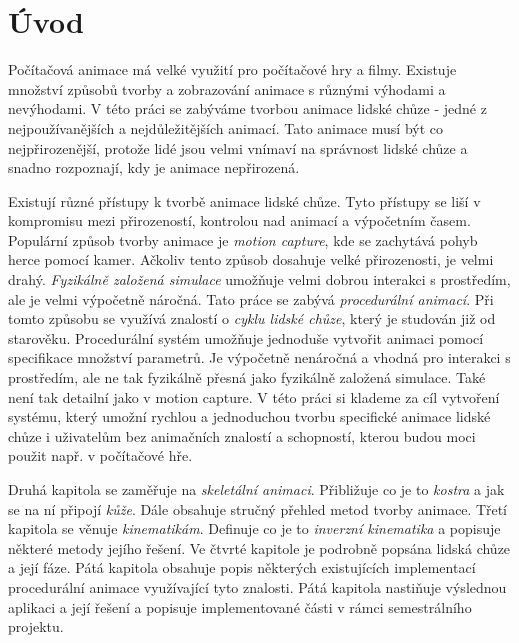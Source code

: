 
\chapter{Úvod}
Počítačová animace má velké využití pro počítačové hry a filmy. Existuje množství způsobů tvorby a zobrazování animace s různými výhodami a nevýhodami. V této práci se zabýváme tvorbou animace lidské chůze - jedné z nejpoužívanějších a nejdůležitějších animací. Tato animace musí být co nejpřirozenější, protože lidé jsou velmi vnímaví na správnost lidské chůze a snadno rozpoznají, kdy je animace nepřirozená.

Existují různé přístupy k tvorbě animace lidské chůze. Tyto přístupy se liší v kompromisu mezi přirozeností, kontrolou nad animací a výpočetním časem. Populární způsob tvorby animace je \textit{motion capture}, kde se zachytává pohyb herce pomocí kamer. Ačkoliv tento způsob dosahuje velké přirozenosti, je velmi drahý. \textit{Fyzikálně založená simulace} umožňuje velmi dobrou interakci s prostředím, ale je velmi výpočetně náročná. Tato práce se zabývá \textit{procedurální animací}. Při tomto způsobu se využívá znalostí o \textit{cyklu lidské chůze}, který je studován již od starověku. Procedurální systém umožňuje jednoduše vytvořit animaci pomocí specifikace množství parametrů. Je výpočetně nenáročná a vhodná pro interakci s prostředím, ale ne tak fyzikálně přesná jako fyzikálně založená simulace. Také není tak detailní jako v motion capture.  V této práci si klademe za cíl vytvoření systému, který umožní rychlou a jednoduchou tvorbu specifické animace lidské chůze i uživatelům bez animačních znalostí a schopností, kterou budou moci použit např. v počítačové hře.

Druhá kapitola se zaměřuje na \textit{skeletální animaci}. Přibližuje co je to \textit{kostra} a jak se na ní připojí \textit{kůže}. Dále obsahuje stručný přehled metod tvorby animace. Třetí kapitola se věnuje \textit{kinematikám}. Definuje co je to \textit{inverzní kinematika} a popisuje některé metody jejího řešení. Ve čtvrté kapitole je podrobně popsána lidská chůze a její fáze. Pátá kapitola obsahuje popis některých existujících implementací procedurální animace využívající tyto znalosti. Pátá kapitola nastiňuje výslednou aplikaci a její řešení a popisuje implementované části v rámci semestrálního projektu.
